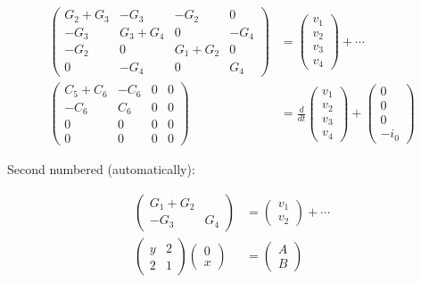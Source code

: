 \n\documentclass[%
oneside,                 %
final,                   %
10pt]{article}
\theoremstyle{definition}
\begin{document}
\begin{enumerate}
\begin{align}
\begin{pmatrix}
G_2 + G_3 & -G_3 & -G_2 & 0 \\ 
-G_3 & G_3 + G_4 & 0 & -G_4 \\ 
-G_2 & 0 & G_1 + G_2 & 0 \\ 
0 & -G_4 & 0 & G_4
\end{pmatrix}
&=
\begin{pmatrix}
 v_1 \\ 
 v_2 \\ 
 v_3 \\ 
 v_4
\end{pmatrix}
+ \cdots \\ 
\begin{pmatrix}
 C_5 + C_6 & -C_6 & 0 & 0 \\ 
 -C_6 & C_6 & 0 & 0 \\ 
 0 & 0 & 0 & 0 \\ 
 0 & 0 & 0 & 0
\end{pmatrix}
  &= \frac{d}{dt}\begin{pmatrix}
 v_1 \\ 
 v_2 \\ 
 v_3 \\ 
 v_4
\end{pmatrix} +
\begin{pmatrix}
 0 \\ 
 0 \\ 
 0 \\ 
 -i_0
\end{pmatrix}
\nonumber
\end{align}

Second numbered (automatically):

\begin{align}
\begin{pmatrix}
G_1 + G_2\\ 
-G_3 & G_4
\end{pmatrix}
&=
\begin{pmatrix}
 v_1 \\ 
 v_2
\end{pmatrix}
+ \cdots\nonumber
\\ 
\left(\begin{array}{ll}
y & 2\\ 
2 & 1
\end{array}\right)
\left(\begin{array}{ll}
0 \\ x
\end{array}\right)
&= \begin{pmatrix}
A \\ B
\end{pmatrix}
\end{align}


\end{enumerate}
\end{document}
